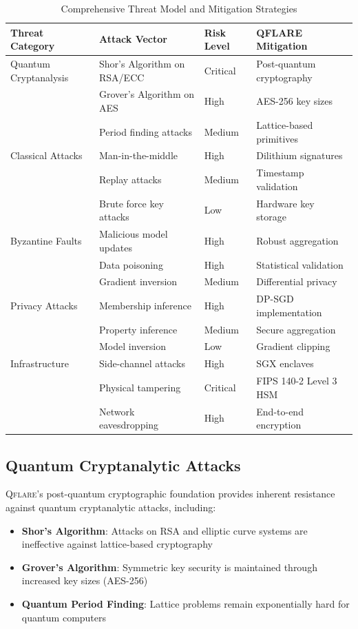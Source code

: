 \documentclass[12pt,a4paper,twoside]{book}
\newcommand{\qflare}{\textsc{Qflare}}
\begin{document}
\begin{table}[htbp]
\centering
\caption{Comprehensive Threat Model and Mitigation Strategies}
\label{tab:threat-analysis}
\begin{tabular}{@{}p{3cm}p{4cm}p{3cm}p{4cm}@{}}
\toprule
\textbf{Threat Category} & \textbf{Attack Vector} & \textbf{Risk Level} & \textbf{QFLARE Mitigation} \\
\midrule
Quantum Cryptanalysis & Shor's Algorithm on RSA/ECC & Critical & Post-quantum cryptography \\
& Grover's Algorithm on AES & High & AES-256 key sizes \\
& Period finding attacks & Medium & Lattice-based primitives \\
\midrule
Classical Attacks & Man-in-the-middle & High & Dilithium signatures \\
& Replay attacks & Medium & Timestamp validation \\
& Brute force key attacks & Low & Hardware key storage \\
\midrule
Byzantine Faults & Malicious model updates & High & Robust aggregation \\
& Data poisoning & High & Statistical validation \\
& Gradient inversion & Medium & Differential privacy \\
\midrule
Privacy Attacks & Membership inference & High & DP-SGD implementation \\
& Property inference & Medium & Secure aggregation \\
& Model inversion & Low & Gradient clipping \\
\midrule
Infrastructure & Side-channel attacks & High & SGX enclaves \\
& Physical tampering & Critical & FIPS 140-2 Level 3 HSM \\
& Network eavesdropping & High & End-to-end encryption \\
\bottomrule
\end{tabular}
\end{table}

\subsection{Quantum Cryptanalytic Attacks}
\label{subsec:quantum-attacks}

\qflare{}'s post-quantum cryptographic foundation provides inherent resistance against quantum cryptanalytic attacks, including:

\begin{itemize}
\item \textbf{Shor's Algorithm}: Attacks on RSA and elliptic curve systems are ineffective against lattice-based cryptography
\item \textbf{Grover's Algorithm}: Symmetric key security is maintained through increased key sizes (AES-256)
\item \textbf{Quantum Period Finding}: Lattice problems remain exponentially hard for quantum computers
\end{itemize}
\end{document}
